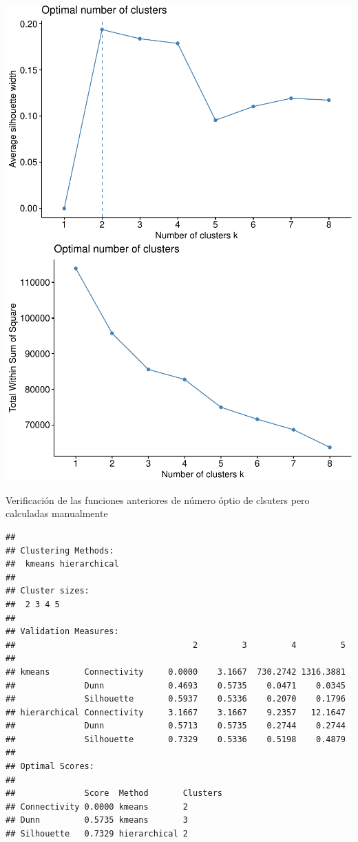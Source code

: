 \documentclass[]{article}
\begin{document}
\includegraphics{00_pca_tsne_cluster_files/figure-latex/unnamed-chunk-15-1.pdf}
\includegraphics{00_pca_tsne_cluster_files/figure-latex/unnamed-chunk-15-2.pdf}

Verificación de las funciones anteriores de número óptio de clsuters
pero calculadas manualmente

\begin{lstlisting}
## 
## Clustering Methods:
##  kmeans hierarchical 
## 
## Cluster sizes:
##  2 3 4 5 
## 
## Validation Measures:
##                                    2         3         4         5
##                                                                   
## kmeans       Connectivity     0.0000    3.1667  730.2742 1316.3881
##              Dunn             0.4693    0.5735    0.0471    0.0345
##              Silhouette       0.5937    0.5336    0.2070    0.1796
## hierarchical Connectivity     3.1667    3.1667    9.2357   12.1647
##              Dunn             0.5713    0.5735    0.2744    0.2744
##              Silhouette       0.7329    0.5336    0.5198    0.4879
## 
## Optimal Scores:
## 
##              Score  Method       Clusters
## Connectivity 0.0000 kmeans       2       
## Dunn         0.5735 kmeans       3       
## Silhouette   0.7329 hierarchical 2
\end{lstlisting}
\end{document}
